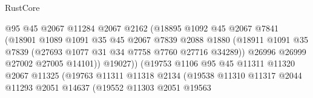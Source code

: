 \begin{lexlean}{RustCore}
\begin{coremodule}
                                        @95
                                        @45
                                        @2067
                                        @11284
                                        @2067
                                        @2162
                                        (@18895
                                          @1092
                                          @45
                                          @2067
                                          @7841
                                          (@18901
                                            @1089
                                            @1091
                                            @35
                                            @45
                                            @2067
                                            @7839
                                            @2088
                                            @1880
                                            (@18911
                                              @1091
                                              @35
                                              @7839
                                              (@27693 @1077 @31 @34 @7758 @7760 @27716 @34289))
                                            @26996
                                            @26999
                                            @27002
                                            @27005
                                            @14101))
                                        @19027))
                                    (@19753
                                      @1106
                                      @95
                                      @45
                                      @11311
                                      @11320
                                      @2067
                                      @11325
                                      (@19763
                                        @11311
                                        @11318
                                        @2134
                                        (@19538
                                          @11310
                                          @11317
                                          @2044
                                          @11293
                                          @2051
                                          @14637
                                          (@19552
                                            @11303
                                            @2051
                                            @19563

\end{coremodule}
\end{lexlean}
